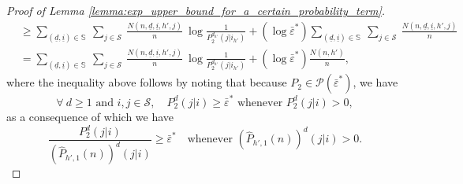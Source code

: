 \begin{proof}[Proof of Lemma \ref{lemma:exp_upper_bound_for_a_certain_probability_term}]
\begin{align}
	&\geq \sum\limits_{(\underline{d}, \underline{i})\in \mathbb{S}}~\sum\limits_{j\in \mathcal{S}}~\frac{N(n, \underline{d}, \underline{i}, h', j)}{n}~\log\frac{1}{P_2^{d_{h'}}(j|i_{h'})} + (\log \bar{\varepsilon}^*)\sum\limits_{(\underline{d}, \underline{i})\in \mathbb{S}}~\sum\limits_{j\in \mathcal{S}}~\frac{N(n, \underline{d}, \underline{i}, h', j)}{n}\nonumber\\
	&=\sum\limits_{(\underline{d}, \underline{i})\in \mathbb{S}}~\sum\limits_{j\in \mathcal{S}}~\frac{N(n, \underline{d}, \underline{i}, h', j)}{n}~\log\frac{1}{P_2^{d_{h'}}(j|i_{h'})} + (\log \bar{\varepsilon}^*)\frac{N(n, h')}{n},
	\label{eq:lower_bound_for_T_3(n)/n}
\end{align}
where the inequality above follows by noting that because $P_2\in \mathscr{P}(\bar{\varepsilon}^*)$, we have $$ \forall~ d\geq 1 \text{ and }i, j\in \mathcal{S}, \quad P_2^d(j|i)\geq\bar{\varepsilon}^*  \text{ whenever } P_2^d(j|i)>0,$$ as a consequence of which we have $$ \frac{P_2^d(j|i)}{(\hat{P}_{h', 1}(n))^d(j|i)}\geq \bar{\varepsilon}^*\quad \text{whenever }(\hat{P}_{h', 1}(n))^d(j|i)>0.$$


\end{proof}
